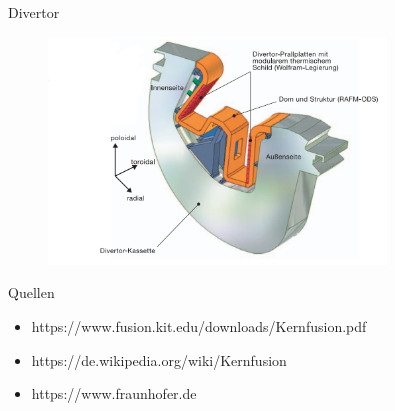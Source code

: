 \documentclass[aspectratio=169,xcolor=dvipsnames,14pt]{beamer}
\begin{document}
\begin{frame}{Divertor}
    \begin{figure}
        \centering
        \includegraphics[width=0.8\textwidth]{Images/Divertor.png}
    \end{figure}    
\end{frame}

\begin{frame}{Quellen}
\begin{itemize}
    \color{LightGrey}
\item https://www.fusion.kit.edu/downloads/Kernfusion.pdf
\item https://de.wikipedia.org/wiki/Kernfusion
\item https://www.fraunhofer.de
\end{itemize}
\end{frame}
\end{document}

